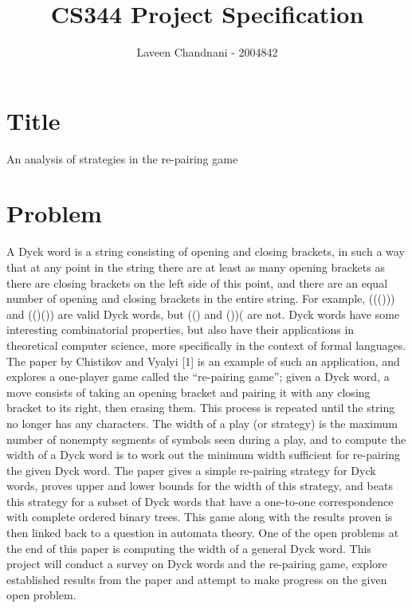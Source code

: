 \documentclass[a4paper]{article}
\title{CS344 Project Specification}
\author{Laveen Chandnani - 2004842}
\date{}
\begin{document}
\maketitle
\section{Title}
An analysis of strategies in the re-pairing game

\section{Problem}
A Dyck word is a string consisting of opening and closing brackets, in such a way that at any point in the string there are at least as many opening brackets as there are closing brackets on the left side of this point, and there are an equal number of opening and closing brackets in the entire string. For example, ((())) and (()()) are valid Dyck words, but (() and ())( are not. 
\newline
\newline
Dyck words have some interesting combinatorial properties, but also have their applications in theoretical computer science, more specifically in the context of formal languages. The paper by Chistikov and Vyalyi [1] is an example of such an application, and explores a one-player game called the ``re-pairing game''; given a Dyck word, a move consists of taking an opening bracket and pairing it with any closing bracket to its right, then erasing them. This process is repeated until the string no longer has any characters. The width of a play (or strategy) is the maximum number of nonempty segments of symbols seen during a play, and to compute the width of a Dyck word is to work out the minimum width sufficient for re-pairing the given Dyck word. 
\newline
\newline
The paper gives a simple re-pairing strategy for Dyck words, proves upper and lower bounds for the width of this strategy, and beats this strategy for a subset of Dyck words that have a one-to-one correspondence with complete ordered binary trees. This game along with the results proven is then linked back to a question in automata theory. One of the open problems at the end of this paper is computing the width of a general Dyck word. This project will conduct a survey on Dyck words and the re-pairing game, explore established results from the paper and attempt to make progress on the given open problem.
\end{document}
